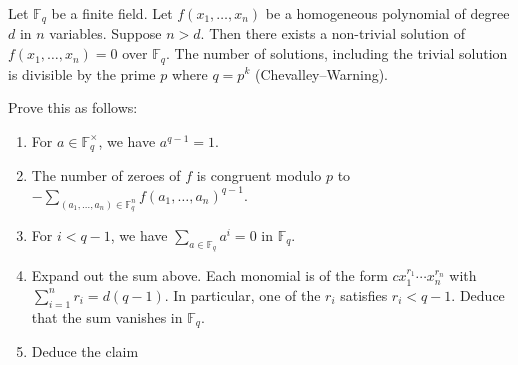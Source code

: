 \documentclass[12 pt, letterpaper]{hmcpset}
\begin{document}
\begin{problem}[(1)]
	Let $\mathbb{F}_{q}$ be a finite field. Let $f(x_{1}, \dots, x_{n})$ be a homogeneous polynomial of degree $d$ in $n$ variables. Suppose $n > d$. Then there exists a non-trivial solution of $f(x_{1}, \dots, x_{n}) = 0$ over $\mathbb{F}_{q}$. The number of solutions, including the trivial solution is divisible by the prime $p$ where $q = p^{k}$ (Chevalley--Warning).

	Prove this as follows:
	\begin{enumerate}
		\item For $a \in \mathbb{F}_{q}^{\times}$, we have $a^{q - 1} = 1$.
		\item The number of zeroes of $f$ is congruent modulo $p$ to $-\sum_{(a_{1}, \dots, a_{n}) \in \mathbb{F}_{q}^{n}} f(a_{1}, \dots, a_{n})^{q - 1}$.
		\item For $i < q - 1$, we have $\sum_{a \in \mathbb{F}_{q}} a^{i} = 0$ in $\mathbb{F}_{q}$.
		\item Expand out the sum above. Each monomial is of the form $c x_{1}^{r_{1}} \cdots x_{n}^{r_{n}}$ with $\sum_{i = 1}^{n} r_{i} = d (q - 1)$. In particular, one of the $r_{i}$ satisfies $r_{i} < q - 1$. Deduce that the sum vanishes in $\mathbb{F}_{q}$.
		\item Deduce the claim
	\end{enumerate}
\end{problem}
\end{document}
